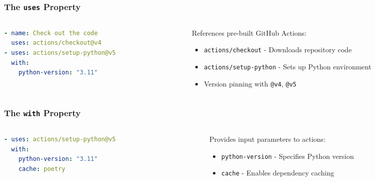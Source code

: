 \begin{frame}[fragile]
	\frametitle{The \texttt{uses} Property}
	\begin{columns}
		\begin{column}{0.5\textwidth}
			\begin{lstlisting}[language=yaml,basicstyle=\small\ttfamily]
- name: Check out the code
  uses: actions/checkout@v4
- uses: actions/setup-python@v5
  with:
    python-version: "3.11"
			\end{lstlisting}
		\end{column}
		\begin{column}{0.5\textwidth}
			References pre-built GitHub Actions:
			\begin{itemize}
				\item \texttt{actions/checkout} - Downloads repository code
				\item \texttt{actions/setup-python} - Sets up Python environment
				\item Version pinning with \texttt{@v4}, \texttt{@v5}
			\end{itemize}
		\end{column}
	\end{columns}
\end{frame}

\begin{frame}[fragile]
	\frametitle{The \texttt{with} Property}
	\begin{columns}
		\begin{column}{0.5\textwidth}
			\begin{lstlisting}[language=yaml,basicstyle=\small\ttfamily]
- uses: actions/setup-python@v5
  with:
    python-version: "3.11"
    cache: poetry
			\end{lstlisting}
		\end{column}
		\begin{column}{0.5\textwidth}
			Provides input parameters to actions:
			\begin{itemize}
				\item \texttt{python-version} - Specifies Python version
				\item \texttt{cache} - Enables dependency caching
			\end{itemize}
		\end{column}
	\end{columns}
\end{frame}

